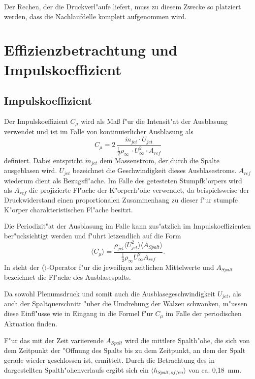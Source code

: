 Der Rechen, der die Druckverl"aufe liefert, muss zu diesem Zwecke so platziert werden, dass die Nachlaufdelle komplett aufgenommen wird. 


\section{Effizienzbetrachtung und Impulskoeffizient}

\subsection{Impulskoeffizient}
Der Impulskoeffizient $C_{\mu}$ wird als Ma\ss{} f"ur die Intensit"at der Ausblasung verwendet und ist im Falle von kontinuierlicher Ausblasung als 
\begin{equation}
	\label{eq: Def-momentum-coeff}
	C_{\mu} = 2 \,\frac{\dot{m}_{jet} \cdot U_{jet}}{\frac{1}{2}\rho_{\infty}\, \cdot U^2_{\infty} \cdot A_{ref}}
\end{equation}
definiert\cite{ElSayedM..2018}.
Dabei entspricht $\dot{m}_{jet}$ dem Massenstrom, der durch die Spalte ausgeblasen wird. $U_{jet}$ bezeichnet die Geschwindigkeit dieses Ausblasestroms.
$A_{ref}$ wiederum dient als Bezugsfl"ache. Im Falle des getesteten Stumpfk"orpers wird als $A_{ref}$ die projizierte Fl"ache der K"orperh"ohe verwendet, da beispielsweise der Druckwiderstand einen proportionalen Zusammenhang zu dieser f"ur stumpfe K"orper charakteristischen Fl"ache besitzt.  %

Die Periodizit"at der Ausblasung im Falle kann zus"atzlich im Impulskoeffizienten ber"ucksichtigt werden und f"uhrt letzendlich auf die Form \cite{Chabert.2014}
\begin{equation}
	\label{eq:momentum-coeff-oscill}
	\langle{C_{\mu}}\rangle = \frac{\rho_{jet}\langle{U^2_{jet}}\rangle \langle{A_{Spalt}}\rangle} {\frac{1}{2}\rho_{\infty}U^2_{\infty}A_{ref}}.	
\end{equation}
In  steht der $\langle{}\rangle$-Operator f"ur die jeweiligen zeitlichen Mittelwerte und $A_{Spalt}$ bezeichnet die Fl"ache des Ausblasespalts.

Da sowohl Plenumsdruck und somit auch die Ausblasegeschwindigkeit $U_{jet}$, als auch der Spaltquerschnitt "uber die Umdrehung der Walzen schwanken, m"ussen diese Einfl"usse wie in  Eingang in die Formel f"ur $C_{\mu}$ im Falle der periodischen Aktuation finden.

F"ur das mit der Zeit variierende $A_{Spalt}$   wird die mittlere Spalth"ohe, die sich von dem Zeitpunkt der "Offnung des Spalts bis zu dem Zeitpunkt, an dem der Spalt gerade wieder geschlossen ist, ermittelt.  
Durch die Betrachtung des in  dargestellten Spalth"ohenverlaufs ergibt sich ein $\langle{h_{Spalt,offen}}\rangle$ von ca. 0,18 \,mm.

